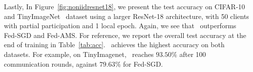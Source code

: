 \documentclass[twoside]{article}
\begin{document}
Lastly, In Figure~\ref{fig:noniidresnet18}, we present the test accuracy on CIFAR-10 and TinyImageNet~\citep{le2015tiny} dataset using a larger ResNet-18 architecture, with 50 clients with partial participation and 1 local epoch. Again, we see that \algo\ outperforms Fed-SGD and Fed-AMS. For reference, we report the overall test accuracy at the end of training in Table~\ref{tab:acc}. \algo\ achieves the highest accuracy on both datasets. For example, on TinyImagenet, \algo\ reaches $93.50\%$ after 100 communication rounds, against $79.63\%$ for Fed-SGD.

%
%
%
%
%
%
\end{document}
